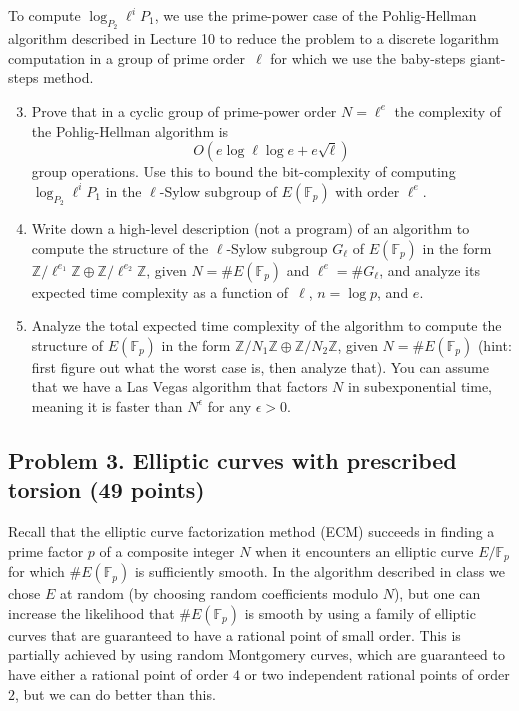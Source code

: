 \documentclass[11pt]{article}
\newcommand{\Fp}{\mathbb{F}_p}
\newcommand{\Z}{\mathbb{Z}}
\theoremstyle{definition}
\begin{document}
To compute $\log_{P_2}\ell^iP_1$, we use the prime-power case of the Pohlig-Hellman algorithm described in Lecture 10 to reduce the problem to a discrete logarithm computation in a group of prime order~$\ell$ for which we use the baby-steps giant-steps method.
\begin{enumerate}[{\bf (a)}]
\setcounter{enumi}{2}
\item Prove that in a cyclic group of prime-power order $N=\ell^e$ the complexity of the Pohlig-Hellman algorithm is
\[
O(e\log\ell\log e + e\sqrt{\ell})
\]
group operations.
Use this to bound the bit-complexity of computing $\log_{P_2}\ell^iP_1$ in the $\ell$-Sylow subgroup of $E(\Fp)$ with order $\ell^e$.
\item
Write down a high-level description (not a program) of an algorithm to compute the structure of the $\ell$-Sylow subgroup $G_\ell$ of $E(\Fp)$ in the form $\Z/\ell^{e_1}\Z\oplus\Z/\ell^{e_2}\Z$, given $N=\#E(\Fp)$ and $\ell^e=\#G_\ell$, and analyze its expected time complexity as a function of~$\ell$, $n=\log p$, and $e$.
\item
Analyze the total expected time complexity of the algorithm to compute the structure of $E(\Fp)$ in the form $\Z/N_1\Z\oplus\Z/N_2\Z$, given $N=\#E(\Fp)$ (hint: first figure out what the worst case is, then analyze that).
You can assume that we have a Las Vegas algorithm that factors $N$ in subexponential time, meaning it is faster than $N^\epsilon$ for any $\epsilon > 0$.
\end{enumerate}

\subsection*{Problem 3. Elliptic curves with prescribed torsion (49 points)}

Recall that the elliptic curve factorization method (ECM) succeeds in finding a prime factor $p$ of a composite integer $N$ when it encounters an elliptic curve $E/\Fp$ for which $\#E(\Fp)$ is sufficiently smooth.  In the algorithm described in class we chose $E$ at random (by choosing random coefficients modulo $N$), but one can increase the likelihood that $\#E(\Fp)$ is smooth by using a family of elliptic curves that are guaranteed to have a rational point of small order.
This is partially achieved by using random Montgomery curves, which are guaranteed to have either a rational point of order $4$ or two independent rational points of order $2$, but we can do better than this.
\end{document}
